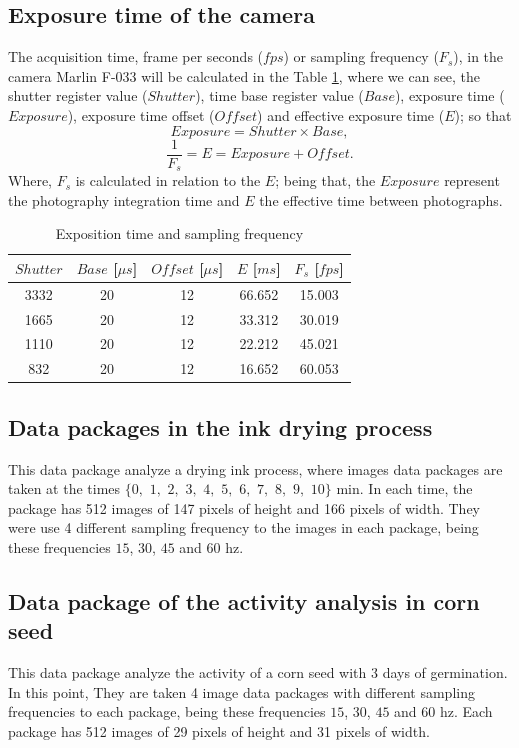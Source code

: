 \documentclass[review]{elsarticle}
\begin{document}
\subsection{Exposure time of the camera}
\label{subsec:expositiontime}
The acquisition time,  frame per seconds ($fps$) or sampling frequency ($F_s$), 
in the camera Marlin F-033 will be calculated in the 
 Table \ref{table:1}, where we can see, the shutter register value ($Shutter$), 
time base register value ($Base$),
exposure time ($Exposure$),
exposure time offset ($Offset$) and
effective exposure time ($E$); so that 
\begin{equation}
Exposure= Shutter \times Base,
\end{equation}
\begin{equation}
\frac{1}{F_s}=E= Exposure + Offset.
\end{equation}
Where,  $F_s$ is calculated in relation to the  $E$; being that,
the $Exposure$ represent the photography integration time and $E$ the effective time
between photographs.
\begin{table}[h!]
\centering
\begin{tabular}{||c c c c c||} 
 \hline
 $Shutter$ &  $Base$ [$\mu s$] & $Offset$ [$\mu s$] & $E$ [$ms$] & $F_s$ [$fps$]\\ [0.5ex] 
 \hline\hline
 3332  & 20  & 12  & 66.652  & 15.003  \\ 
 1665  & 20  & 12  & 33.312  & 30.019  \\ 
 1110  & 20  & 12  & 22.212  & 45.021  \\ 
 832   & 20  & 12  & 16.652  & 60.053  \\ [1ex] 
 \hline
\end{tabular}
\caption{Exposition time and sampling frequency}
\label{table:1}
\end{table}

\subsection{Data packages in the ink drying process}
\label{subsec:data1}
 This data package analyze a drying ink process, 
 where images data packages are taken at the times
 $\{0,$ $1,$ $2,$ $3,$ $4,$ $5,$ $6,$ $7,$ $8,$ $9,$ $10\}$ min. 
 In each time, the package
 has 512 images of 147 pixels of height and 166 pixels of width.
 They were use 4 different sampling frequency to the images in each package,
 being these frequencies $15$, $30$, $45$ and $60$ hz.

\subsection{Data package of the activity analysis in corn seed}
\label{subsec:data2}
 This data package analyze the activity of a corn seed with 3 days of germination. 
 In this point, 
 They are taken 4 image data packages with different sampling frequencies to each package,
 being these frequencies $15$, $30$, $45$ and $60$ hz.
 Each package has 512 images of 29 pixels of height and 31 pixels of width.
 
\end{document}
